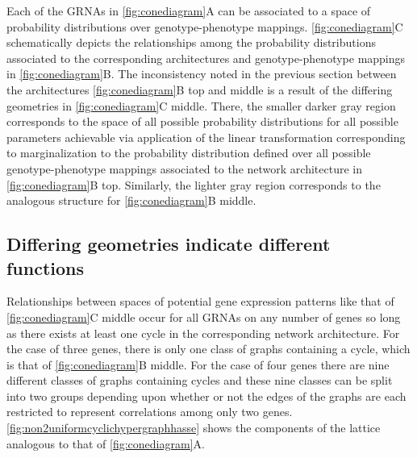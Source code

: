 Each of the GRNAs in \ref{fig:conediagram}A can be associated to a space of probability distributions over genotype-phenotype mappings. \ref{fig:conediagram}C schematically depicts the relationships among the probability distributions associated to the corresponding architectures and genotype-phenotype mappings in \ref{fig:conediagram}B. The inconsistency noted in the previous section between the architectures \ref{fig:conediagram}B top and middle is a result of the differing geometries in \ref{fig:conediagram}C middle. There, the smaller darker gray region corresponds to the space of all possible probability distributions for all possible parameters achievable via application of the linear transformation corresponding to marginalization to the probability distribution defined over all possible genotype-phenotype mappings associated to the network architecture in \ref{fig:conediagram}B top. Similarly, the lighter gray region corresponds to the analogous structure for \ref{fig:conediagram}B middle.


\subsection{Differing geometries indicate different functions}
Relationships between spaces of potential gene expression patterns like that of \ref{fig:conediagram}C middle occur for all GRNAs on any number of genes so long as there exists at least one cycle in the corresponding network architecture. For the case of three genes, there is only one class of graphs containing a cycle, which is that of \ref{fig:conediagram}B middle. For the case of four genes there are nine different classes of graphs containing cycles and these nine classes can be split into two groups depending upon whether or not the edges of the graphs are each restricted to represent correlations among only two genes. \ref{fig:non2uniformcyclichypergraphhasse} shows the components of the lattice analogous to that of \ref{fig:conediagram}A.

